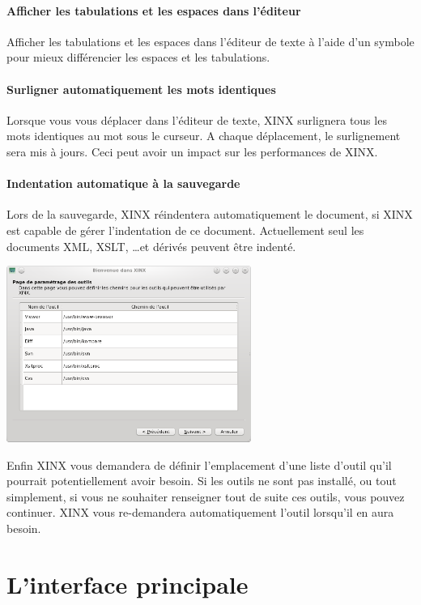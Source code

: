 \documentclass[a4paper,10pt,twoside]{book}
\begin{document}
\paragraph{Afficher les tabulations et les espaces dans l'éditeur} Afficher les tabulations et les espaces dans l'éditeur de texte à l'aide d'un symbole pour mieux différencier les espaces et les tabulations.

\paragraph{Surligner automatiquement les mots identiques} Lorsque vous vous déplacer dans l'éditeur de texte, XINX surlignera tous les mots identiques au mot sous le curseur. A chaque déplacement, le surlignement sera mis à jours. Ceci peut avoir un impact sur les performances de XINX.

\paragraph{Indentation automatique à la sauvegarde} Lors de la sauvegarde, XINX réindentera automatiquement le document, si XINX est capable de gérer l'indentation de ce document. Actuellement seul les documents XML, XSLT, \dots et dérivés peuvent être indenté.

\begin{center}
 \includegraphics[width=0.60\textwidth]{./firstinstall4.png}
\end{center}

Enfin XINX vous demandera de définir l'emplacement d'une liste d'outil qu'il pourrait potentiellement avoir besoin. Si les outils ne sont pas installé, ou tout simplement, si vous ne souhaiter renseigner tout de suite ces outils, vous pouvez continuer. XINX vous re-demandera automatiquement l'outil lorsqu'il en aura besoin.

\section{L'interface principale}
\end{document}
